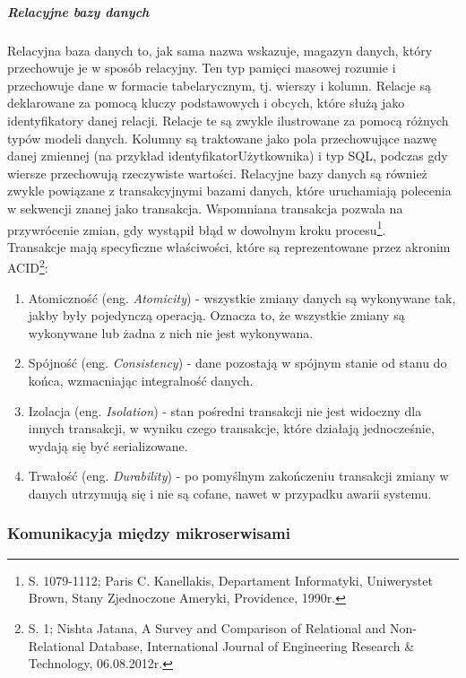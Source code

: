 \documentclass[12pt, a4paper, twoside, openany]{book}
\newcommand{\forceindent}{\leavevmode{\parindent=1.3em\indent}}
\begin{document}
\subparagraph{Relacyjne bazy danych\\}
\forceindent Relacyjna baza danych to, jak sama nazwa wskazuje, magazyn danych, który przechowuje je w sposób relacyjny.
Ten typ pamięci masowej rozumie i przechowuje dane w formacie tabelarycznym, tj. wierszy i kolumn.
Relacje są deklarowane za pomocą kluczy podstawowych i obcych, które służą jako identyfikatory danej relacji.
Relacje te są zwykle ilustrowane za pomocą różnych typów modeli danych.
Kolumny są traktowane jako pola przechowujące nazwę danej zmiennej (na przykład identyfikatorUżytkownika) i typ SQL, podczas gdy wiersze przechowują rzeczywiste wartości.
Relacyjne bazy danych są również zwykle powiązane z transakcyjnymi bazami danych, które uruchamiają polecenia w sekwencji znanej jako transakcja.
Wspomniana transakcja pozwala na przywrócenie zmian, gdy wystąpił błąd w dowolnym kroku procesu\footnote{S. 1079-1112; Paris C. Kanellakis, Departament Informatyki, Uniwerystet Brown, Stany Zjednoczone Ameryki, Providence, 1990r.}.\\
Transakcje mają specyficzne właściwości, które są reprezentowane przez akronim ACID\footnote{S. 1; Nishta Jatana, A Survey and Comparison of Relational and Non-Relational Database, International Journal of Engineering Research \& Technology, 06.08.2012r.}:
\begin{enumerate}[label=--]
    \item Atomiczność (eng. \textit{Atomicity}) - wszystkie zmiany danych są wykonywane tak, jakby były pojedynczą operacją. Oznacza to, że wszystkie zmiany są wykonywane lub żadna z nich nie jest wykonywana.
    \item Spójność (eng. \textit{Consistency}) - dane pozostają w spójnym stanie od stanu do końca, wzmacniając integralność danych.
    \item Izolacja (eng. \textit{Isolation}) - stan pośredni transakcji nie jest widoczny dla innych transakcji, w wyniku czego transakcje, które działają jednocześnie, wydają się być serializowane.
    \item Trwałość (eng. \textit{Durability}) - po pomyślnym zakończeniu transakcji zmiany w danych utrzymują się i nie są cofane, nawet w przypadku awarii systemu.
\end{enumerate}


\subsubsection{Komunikacyja między mikroserwisami}
\end{document}
